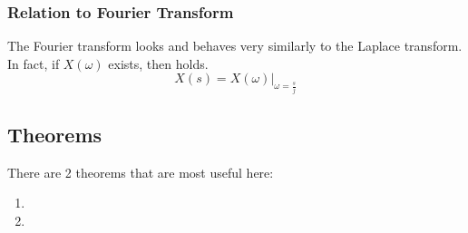 \subsubsection{Relation to Fourier Transform}\label{subsubsec:Fourier_Transform_Relation}
The Fourier transform looks and behaves very similarly to the Laplace transform.
In fact, if $X(\omega)$ exists, then  holds.
\begin{equation}\label{eq:Fourier_Laplace_Transform_Relation}
  X(s) = X(\omega) \vert_{\omega = \frac{s}{j}}
\end{equation}

\subsection{Theorems}\label{subsec:Laplace_Theorems}
There are 2 theorems that are most useful here:
\begin{enumerate}[noitemsep]
\item {}
\item {}
\end{enumerate}


